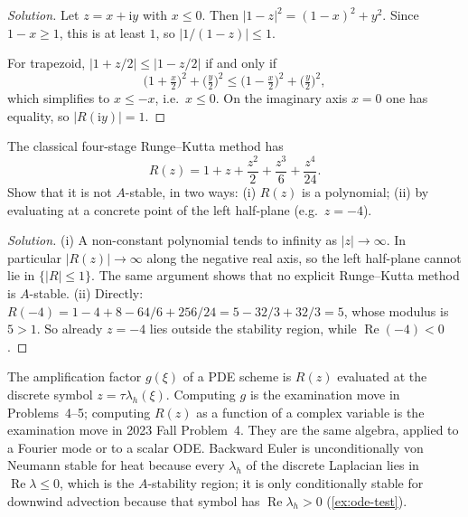 \documentclass[11pt,a4paper]{article}
\begin{document}
\begin{proof}[Solution]
Let \(z=x+\mathrm{i}y\) with \(x\le 0\). Then \(\lvert 1-z\rvert^{2}=(1-x)^{2}+y^{2}\). Since \(1-x\ge 1\), this is at least \(1\), so \(\lvert 1/(1-z)\rvert\le 1\).

For trapezoid, \(\lvert 1+z/2\rvert\le\lvert 1-z/2\rvert\) if and only if
\[
\bigl(1+\tfrac x2\bigr)^{2}+\bigl(\tfrac y2\bigr)^{2}
\le
\bigl(1-\tfrac x2\bigr)^{2}+\bigl(\tfrac y2\bigr)^{2},
\]
which simplifies to \(x\le -x\), i.e.\ \(x\le 0\). On the imaginary axis \(x=0\) one has equality, so \(\lvert R(\mathrm{i}y)\rvert=1\).
\end{proof}

\begin{exercise}
\label{exer:rk4-not-astable}
The classical four-stage Runge--Kutta method has
\[
R(z)=1+z+\frac{z^{2}}{2}+\frac{z^{3}}{6}+\frac{z^{4}}{24}.
\]
Show that it is not \(A\)-stable, in two ways: (i) \(R(z)\) is a polynomial; (ii) by evaluating at a concrete point of the left half-plane (e.g.\ \(z=-4\)).
\end{exercise}

\begin{proof}[Solution]
(i) A non-constant polynomial tends to infinity as \(\lvert z\rvert\to\infty\). In particular \(\lvert R(z)\rvert\to\infty\) along the negative real axis, so the left half-plane cannot lie in \(\{\lvert R\rvert\le 1\}\). The same argument shows that no explicit Runge--Kutta method is \(A\)-stable. (ii) Directly: \(R(-4)=1-4+8-64/6+256/24=5-32/3+32/3=5\), whose modulus is \(5>1\). So already \(z=-4\) lies outside the stability region, while \(\operatorname{Re}(-4)<0\).
\end{proof}

\begin{remark}
\label{rem:pde-is-r-of-z}
The amplification factor \(g(\xi)\) of a PDE scheme is \(R(z)\) evaluated at the discrete symbol \(z=\tau\lambda_{h}(\xi)\). Computing \(g\) is the examination move in Problems~4--5; computing \(R(z)\) as a function of a complex variable is the examination move in 2023 Fall Problem~4. They are the same algebra, applied to a Fourier mode or to a scalar ODE. Backward Euler is unconditionally von Neumann stable for heat because every \(\lambda_{h}\) of the discrete Laplacian lies in \(\operatorname{Re}\lambda\le 0\), which is the \(A\)-stability region; it is only conditionally stable for downwind advection because that symbol has \(\operatorname{Re}\lambda_{h}>0\) (\cref{ex:ode-test}).
\end{remark}
\end{document}
